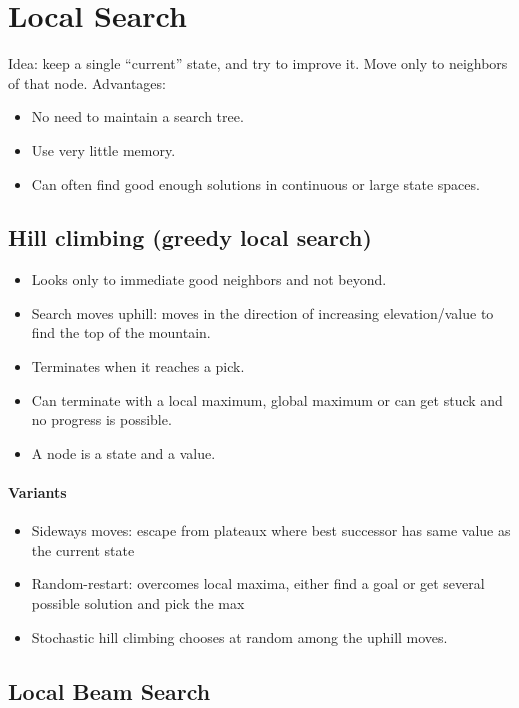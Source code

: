 \section{Local Search}

Idea: keep a single “current” state, and try to improve it.  Move
only to neighbors of that node.
Advantages:
\begin{itemize}
  \item No need to maintain a search tree.
  \item Use very little memory.
  \item Can often find good enough solutions in continuous or large
state spaces.
\end{itemize}

\subsection{Hill climbing (greedy local search)}

\begin{itemize}
  \item Looks only to immediate good neighbors and not beyond.
  \item Search moves uphill: moves in the direction of increasing elevation/value to find the top of the mountain.
  \item Terminates when it reaches a pick.
  \item Can terminate with a local maximum, global maximum or can get stuck and no progress is possible.
  \item A node is a state and a value.
\end{itemize}

\paragraph{Variants}
\begin{itemize}
  \item Sideways moves: escape from plateaux where best successor
    has same value as the current state
  \item Random-restart: overcomes local maxima,
    either find a goal or get several possible solution
    and pick the max
  \item Stochastic hill climbing chooses at random among the
    uphill moves.
\end{itemize}

\subsection{Local Beam Search}


